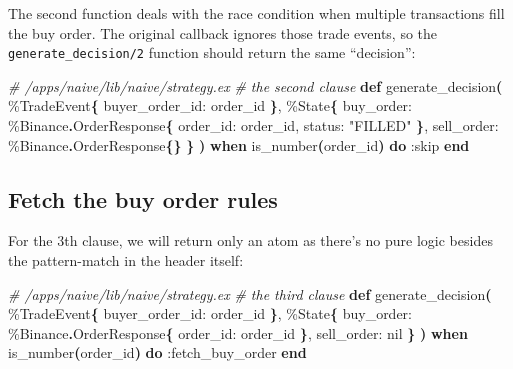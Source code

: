 \documentclass[
  oneside]{book}
\newenvironment{Shaded}{\begin{snugshade}}{\end{snugshade}}
\newcommand{\CommentTok}[1]{\textcolor[rgb]{0.56,0.35,0.01}{\textit{#1}}}
\newcommand{\ConstantTok}[1]{\textcolor[rgb]{0.56,0.35,0.01}{#1}}
\newcommand{\FunctionTok}[1]{\textcolor[rgb]{0.13,0.29,0.53}{\textbf{#1}}}
\newcommand{\KeywordTok}[1]{\textcolor[rgb]{0.13,0.29,0.53}{\textbf{#1}}}
\newcommand{\NormalTok}[1]{#1}
\newcommand{\OperatorTok}[1]{\textcolor[rgb]{0.81,0.36,0.00}{\textbf{#1}}}
\newcommand{\StringTok}[1]{\textcolor[rgb]{0.31,0.60,0.02}{#1}}
\newcommand{\VariableTok}[1]{\textcolor[rgb]{0.00,0.00,0.00}{#1}}
\begin{document}
The second function deals with the race condition when multiple transactions fill the buy order. The original callback ignores those trade events, so the \texttt{generate\_decision/2} function should return the same ``decision'':

\begin{Shaded}
\begin{Highlighting}[]
\CommentTok{\# /apps/naive/lib/naive/strategy.ex}
\CommentTok{\# the second clause}
  \KeywordTok{def}\NormalTok{ generate\_decision}\FunctionTok{(}
\NormalTok{        \%}\ConstantTok{TradeEvent}\FunctionTok{\{}
          \VariableTok{buyer\_order\_id:}\NormalTok{ order\_id}
        \FunctionTok{\}}\NormalTok{,}
\NormalTok{        \%}\ConstantTok{State}\FunctionTok{\{}
          \VariableTok{buy\_order:}\NormalTok{ \%}\ConstantTok{Binance}\OperatorTok{.}\ConstantTok{OrderResponse}\FunctionTok{\{}
            \VariableTok{order\_id:}\NormalTok{ order\_id,}
            \VariableTok{status:} \StringTok{"FILLED"}
          \FunctionTok{\}}\NormalTok{,}
          \VariableTok{sell\_order:}\NormalTok{ \%}\ConstantTok{Binance}\OperatorTok{.}\ConstantTok{OrderResponse}\FunctionTok{\{\}}
        \FunctionTok{\}}
      \FunctionTok{)}
      \KeywordTok{when}\NormalTok{ is\_number}\FunctionTok{(}\NormalTok{order\_id}\FunctionTok{)} \KeywordTok{do}
    \VariableTok{:skip}
  \KeywordTok{end}
\end{Highlighting}
\end{Shaded}

\subsection{Fetch the buy order rules}\label{fetch-the-buy-order-rules}

For the 3th clause, we will return only an atom as there's no pure logic besides the pattern-match in the header itself:

\begin{Shaded}
\begin{Highlighting}[]
\CommentTok{\# /apps/naive/lib/naive/strategy.ex}
\CommentTok{\# the third clause}
  \KeywordTok{def}\NormalTok{ generate\_decision}\FunctionTok{(}
\NormalTok{        \%}\ConstantTok{TradeEvent}\FunctionTok{\{}
          \VariableTok{buyer\_order\_id:}\NormalTok{ order\_id}
        \FunctionTok{\}}\NormalTok{,}
\NormalTok{        \%}\ConstantTok{State}\FunctionTok{\{}
          \VariableTok{buy\_order:}\NormalTok{ \%}\ConstantTok{Binance}\OperatorTok{.}\ConstantTok{OrderResponse}\FunctionTok{\{}
            \VariableTok{order\_id:}\NormalTok{ order\_id}
          \FunctionTok{\}}\NormalTok{,}
          \VariableTok{sell\_order:} \ConstantTok{nil}
        \FunctionTok{\}}
      \FunctionTok{)}
      \KeywordTok{when}\NormalTok{ is\_number}\FunctionTok{(}\NormalTok{order\_id}\FunctionTok{)} \KeywordTok{do}
    \VariableTok{:fetch\_buy\_order}
  \KeywordTok{end}
\end{Highlighting}
\end{Shaded}
\end{document}

